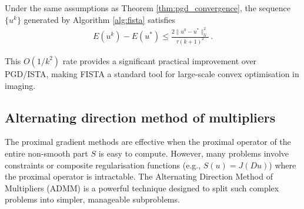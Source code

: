 \begin{thm}\label{thm:fista_convergence}\normalfont
Under the same assumptions as Theorem \ref{thm:pgd_convergence}, the sequence $\{u^k\}$ generated by Algorithm \ref{alg:fista} satisfies
\begin{align*}
E(u^k) - E(u^*) \leq \frac{2\|u^0 - u^*\|_\mathcal{U}^2}{\tau (k+1)^2} \, .
\end{align*}
\end{thm}
This $O(1/k^2)$ rate provides a significant practical improvement over PGD/ISTA, making FISTA a standard tool for large-scale convex optimisation in imaging.

\subsection{Alternating direction method of multipliers}

The proximal gradient methods are effective when the proximal operator of the entire non-smooth part $S$ is easy to compute. However, many problems involve constraints or composite regularisation functions (e.g., $S(u) = J(Du)$) where the proximal operator is intractable. The Alternating Direction Method of Multipliers (ADMM) \cite{Gabay1983ADMM, Boyd2011ADMM} is a powerful technique designed to split such complex problems into simpler, manageable subproblems.

